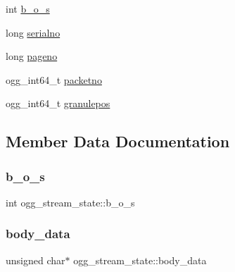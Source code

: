 \begin{DoxyCompactItemize}
\item 
int \hyperlink{structogg__stream__state_a76fcc3bf6a59eff87ec3bee1d16fa0b5}{b\+\_\+o\+\_\+s}
\item 
long \hyperlink{structogg__stream__state_a79248e3f1f41cde5331909e8edd98e10}{serialno}
\item 
long \hyperlink{structogg__stream__state_a0ad3315203fcebdc2ccd3b050d28a65c}{pageno}
\item 
ogg\+\_\+int64\+\_\+t \hyperlink{structogg__stream__state_a1bebf380025b6ca0841497e7ab2b5c34}{packetno}
\item 
ogg\+\_\+int64\+\_\+t \hyperlink{structogg__stream__state_a5df750c600660686e29f24b4d1ce836c}{granulepos}
\end{DoxyCompactItemize}


\subsection{Member Data Documentation}
\mbox{\label{structogg__stream__state_a76fcc3bf6a59eff87ec3bee1d16fa0b5}} 
\subsubsection{\texorpdfstring{b\+\_\+o\+\_\+s}{b\_o\_s}}
{\footnotesize\ttfamily int ogg\+\_\+stream\+\_\+state\+::b\+\_\+o\+\_\+s}

\mbox{\label{structogg__stream__state_a70d03b6f99c1d1e57f55e800b087dae8}} 
\subsubsection{\texorpdfstring{body\+\_\+data}{body\_data}}
{\footnotesize\ttfamily unsigned char$\ast$ ogg\+\_\+stream\+\_\+state\+::body\+\_\+data}

\mbox{\label{structogg__stream__state_a19d45a7b5004f13ae02b5a9502354b93}} 
